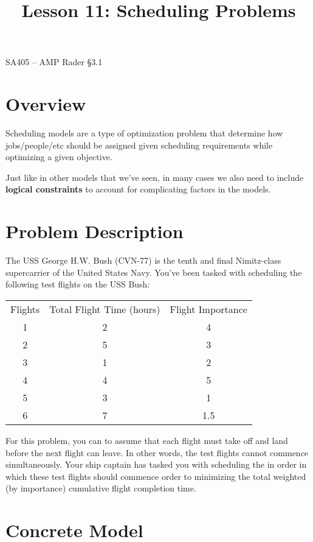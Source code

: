 \documentclass[11pt]{article}
\makeatletter
\theoremstyle{definition}
\renewcommand{\maketitle}{
  \noindent SA405 -- AMP \hfill Rader \S 3.1 \\

  \begin{center}\Large{\textbf{\@title}}\end{center}
}
\makeatother
\begin{document}
  
\title{Lesson 11: Scheduling Problems}

\maketitle

\section{Overview}
Scheduling models are a type of optimization problem that determine how jobs/people/etc should be assigned given scheduling requirements while optimizing a given objective.

Just like in other models that we've seen, in many cases we also need to include \textbf{logical constraints} to account for complicating factors in the models.


\section{Problem Description}

The USS George H.W. Bush (CVN-77) is the tenth and final Nimitz-class supercarrier of the United States Navy. You've been tasked with scheduling the following test flights on the USS Bush:

\begin{center}    
\begin{tabular}{c|c|c}
     Flights & Total Flight Time (hours) & Flight Importance \\
     1 &  2 & 4 \\
     2 &  5 & 3 \\
     3 &  1 & 2 \\
     4 &  4 & 5 \\
     5 &  3 & 1 \\
     6 &  7 & 1.5 \\
\end{tabular}
\end{center}


For this problem, you can to assume that each flight must take off and land before the next flight can leave. In other words, the test flights cannot commence simultaneously. Your ship captain has tasked you with scheduling the in order in which these test flights should commence order to minimizing the total weighted (by importance) cumulative flight completion time. 

\section{Concrete Model}
\end{document}
